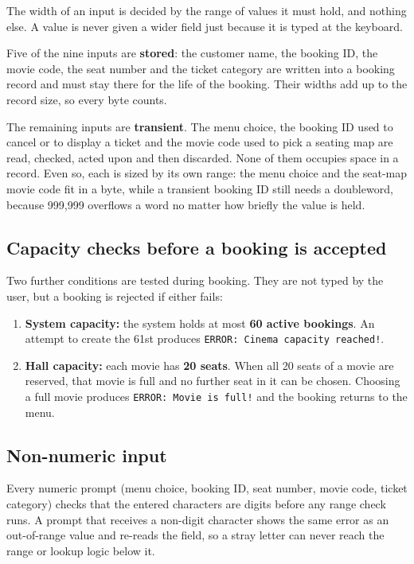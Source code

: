 \documentclass{thesis-library}
\begin{document}
The width of an input is decided by the range of values it must hold, and nothing else. A value is never given a wider field just because it is typed at the keyboard.

Five of the nine inputs are \textbf{stored}: the customer name, the booking ID, the movie code, the seat number and the ticket category are written into a booking record and must stay there for the life of the booking. Their widths add up to the record size, so every byte counts.

The remaining inputs are \textbf{transient}. The menu choice, the booking ID used to cancel or to display a ticket and the movie code used to pick a seating map are read, checked, acted upon and then discarded. None of them occupies space in a record. Even so, each is sized by its own range: the menu choice and the seat-map movie code fit in a byte, while a transient booking ID still needs a doubleword, because 999,999 overflows a word no matter how briefly the value is held.

\subsection*{Capacity checks before a booking is accepted}

Two further conditions are tested during booking. They are not typed by the user, but a booking is rejected if either fails:

\begin{enumerate}
\item \textbf{System capacity:} the system holds at most \textbf{60 active bookings}. An attempt to create the 61st produces \texttt{ERROR: Cinema capacity reached!}.
\item \textbf{Hall capacity:} each movie has \textbf{20 seats}. When all 20 seats of a movie are reserved, that movie is full and no further seat in it can be chosen. Choosing a full movie produces \texttt{ERROR: Movie is full!} and the booking returns to the menu.
\end{enumerate}

\subsection*{Non-numeric input}

Every numeric prompt (menu choice, booking ID, seat number, movie code, ticket category) checks that the entered characters are digits before any range check runs. A prompt that receives a non-digit character shows the same error as an out-of-range value and re-reads the field, so a stray letter can never reach the range or lookup logic below it.
\end{document}
